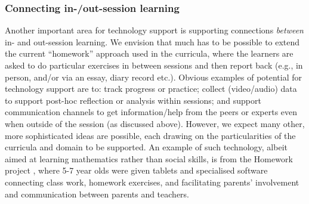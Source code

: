 \documentclass[prodmode,acmtochi]{acmsmall}
\newcommand{\todo}[1]{\textrm{\textrm{\textcolor{LightBlue}{[[#1]]} } } }
\newcommand{\GeraldineTODO}[1]{}
\begin{document}
\subsubsection{Connecting in-/out-session learning}
Another important area for technology support is supporting connections \textit{between}  in- and out-session learning. We envision that much has to be possible to extend the current ``homework'' approach used in the curricula, where the learners are asked to do particular exercises in between sessions and then report back (e.g., in person, and/or via an essay, diary record etc.)\GeraldineTODO{G: do these also need to be mentioned as explicit strategies in the discussions of the  learning principles and current approaches?   }.  Obvious examples of potential for technology support are to: track progress or practice; collect (video/audio) data to support post-hoc reflection or analysis within sessions; and support communication channels to get information/help from the peers or experts even when outside of the session (as discussed above). However, we expect many other, more sophisticated ideas are possible, each drawing on the particularities of the curricula and domain to be supported. An example of such technology, albeit aimed at learning mathematics rather than social skills, is from the Homework project \cite{Luckin2008}, where 5-7 year olds were given tablets and specialised software connecting class work, homework exercises, and facilitating parents' involvement and communication between parents and teachers.


        
\end{document}
